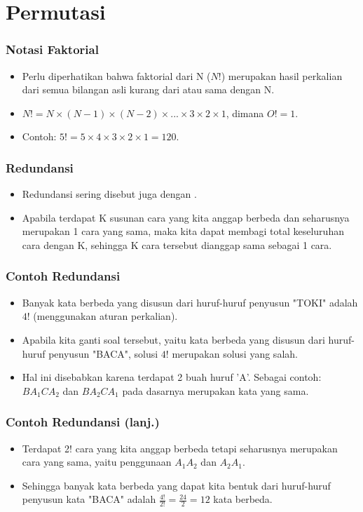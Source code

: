 \section{Permutasi}
\frame{\sectionpage}

\begin{frame}
\frametitle{Notasi Faktorial}
\begin{itemize}
  \item Perlu diperhatikan bahwa faktorial dari N ($N!$) merupakan hasil perkalian dari semua bilangan asli kurang dari atau sama dengan N.
  \item $N! = N \times (N-1) \times (N-2) \times ... \times 3 \times 2 \times 1$, dimana $O! = 1$.
  \item Contoh: $5! = 5 \times 4 \times 3 \times 2 \times 1 = 120$.
\end{itemize}
\end{frame}

\begin{frame}
\frametitle{Redundansi}
\begin{itemize}
  \item Redundansi sering disebut juga dengan .
  \item Apabila terdapat K susunan cara yang kita anggap berbeda dan seharusnya merupakan 1 cara yang sama, maka kita dapat membagi total keseluruhan cara dengan K, sehingga K cara tersebut dianggap sama sebagai 1 cara.
\end{itemize}
\end{frame}

\begin{frame}
\frametitle{Contoh Redundansi}
\begin{itemize}
  \item Banyak kata berbeda yang disusun dari huruf-huruf penyusun "TOKI" adalah $4!$ (menggunakan aturan perkalian).
  \item Apabila kita ganti soal tersebut, yaitu kata berbeda yang disusun dari huruf-huruf penyusun "BACA", solusi $4!$ merupakan solusi yang salah.
  \item Hal ini disebabkan karena terdapat 2 buah huruf 'A'. Sebagai contoh: $BA_{1}CA_{2}$ dan $BA_{2}CA_{1}$ pada dasarnya merupakan kata yang sama.
\end{itemize}
\end{frame}

\begin{frame}
\frametitle{Contoh Redundansi (lanj.)}
\begin{itemize}
  \item Terdapat 2! cara yang kita anggap berbeda tetapi seharusnya merupakan cara yang sama, yaitu penggunaan $A_{1}A_{2}$ dan $A_{2}A_{1}$.
  \item Sehingga banyak kata berbeda yang dapat kita bentuk dari huruf-huruf penyusun kata "BACA" adalah $\frac{4!}{2!} = \frac{24}{2} = 12$ kata berbeda.
\end{itemize}
\end{frame}

